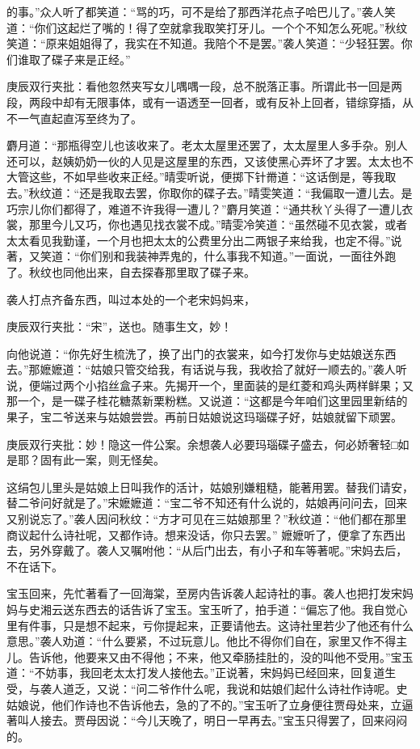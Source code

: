 \begin{parag}
的事。”众人听了都笑道：“骂的巧，可不是给了那西洋花点子哈巴儿了。”袭人笑道：“你们这起烂了嘴的！得了空就拿我取笑打牙儿。一个个不知怎么死呢。”秋纹笑道：“原来姐姐得了，我实在不知道。我陪个不是罢。”袭人笑道：“少轻狂罢。你们谁取了碟子来是正经。”\begin{note}庚辰双行夹批：看他忽然夹写女儿喁喁一段，总不脱落正事。所谓此书一回是两段，两段中却有无限事体，或有一语透至一回者，或有反补上回者，错综穿插，从不一气直起直泻至终为了。\end{note}麝月道：“那瓶得空儿也该收来了。老太太屋里还罢了，太太屋里人多手杂。别人还可以，赵姨奶奶一伙的人见是这屋里的东西，又该使黑心弄坏了才罢。太太也不大管这些，不如早些收来正经。”晴雯听说，便掷下针黹道：“这话倒是，等我取去。”秋纹道：“还是我取去罢，你取你的碟子去。”晴雯笑道：“我偏取一遭儿去。是巧宗儿你们都得了，难道不许我得一遭儿？”麝月笑道：“通共秋丫头得了一遭儿衣裳，那里今儿又巧，你也遇见找衣裳不成。”晴雯冷笑道：“虽然碰不见衣裳，或者太太看见我勤谨，一个月也把太太的公费里分出二两银子来给我，也定不得。”说著，又笑道：“你们别和我装神弄鬼的，什么事我不知道。”一面说，一面往外跑了。秋纹也同他出来，自去探春那里取了碟子来。
\end{parag}


\begin{parag}
    袭人打点齐备东西，叫过本处的一个老宋妈妈来，\begin{note}庚辰双行夹批：“宋”，送也。随事生文，妙！\end{note}向他说道：“你先好生梳洗了，换了出门的衣裳来，如今打发你与史姑娘送东西去。”那嬷嬷道：“姑娘只管交给我，有话说与我，我收拾了就好一顺去的。”袭人听说，便端过两个小掐丝盒子来。先揭开一个，里面装的是红菱和鸡头两样鲜果；又那一个，是一碟子桂花糖蒸新栗粉糕。又说道：“这都是今年咱们这里园里新结的果子，宝二爷送来与姑娘尝尝。再前日姑娘说这玛瑙碟子好，姑娘就留下顽罢。\begin{note}庚辰双行夹批：妙！隐这一件公案。余想袭人必要玛瑙碟子盛去，何必娇奢轻□如是耶？固有此一案，则无怪矣。\end{note}这绢包儿里头是姑娘上日叫我作的活计，姑娘别嫌粗糙，能著用罢。替我们请安，替二爷问好就是了。”宋嬷嬷道：“宝二爷不知还有什么说的，姑娘再问问去，回来又别说忘了。”袭人因问秋纹：“方才可见在三姑娘那里？”秋纹道：“他们都在那里商议起什么诗社呢，又都作诗。想来没话，你只去罢。” 嬷嬷听了，便拿了东西出去，另外穿戴了。袭人又嘱咐他：“从后门出去，有小子和车等著呢。”宋妈去后，不在话下。
\end{parag}


\begin{parag}
    宝玉回来，先忙著看了一回海棠，至房内告诉袭人起诗社的事。袭人也把打发宋妈妈与史湘云送东西去的话告诉了宝玉。宝玉听了，拍手道：“偏忘了他。我自觉心里有件事，只是想不起来，亏你提起来，正要请他去。这诗社里若少了他还有什么意思。”袭人劝道：“什么要紧，不过玩意儿。他比不得你们自在，家里又作不得主儿。告诉他，他要来又由不得他；不来，他又牵肠挂肚的，没的叫他不受用。”宝玉道：“不妨事，我回老太太打发人接他去。”正说著，宋妈妈已经回来，回复道生受，与袭人道乏，又说：“问二爷作什么呢，我说和姑娘们起什么诗社作诗呢。史姑娘说，他们作诗也不告诉他去，急的了不的。”宝玉听了立身便往贾母处来，立逼著叫人接去。贾母因说：“今儿天晚了，明日一早再去。”宝玉只得罢了，回来闷闷的。
\end{parag}


